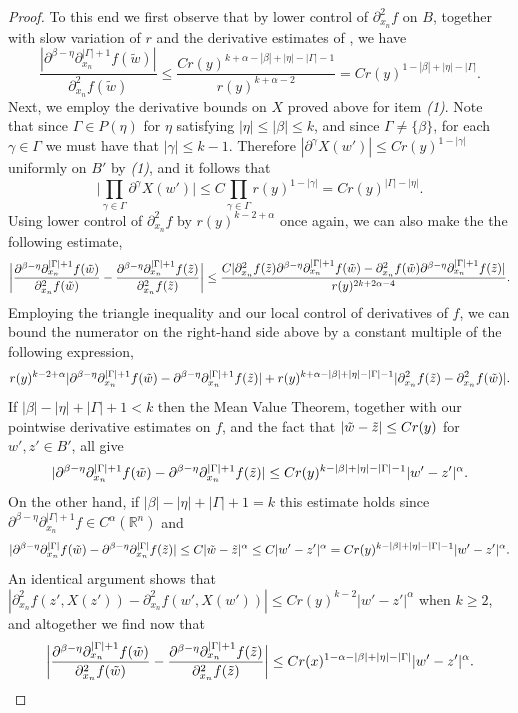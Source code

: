 \documentclass[oneside,hidelinks,indentfirst,10pt]{book}
\begin{document}
\begin{proof}
To this end we first observe that by lower control of \(\partial^2_{x_n}f\) on \(B\), together with slow variation of \(r\) and the derivative estimates of , we have
\[
    \frac{|\partial^{\beta-\eta}\partial^{|\Gamma|+1}_{x_n}f(\tilde{w})|}{\partial^2_{x_n}f(\tilde{w})}\leq \frac{Cr(y)^{k+\alpha-|\beta|+|\eta|-|\Gamma|-1}}{r(y)^{k+\alpha-2}}=Cr(y)^{1-|\beta|+|\eta|-|\Gamma|}.
\]
Next, we employ the derivative bounds on \(X\) proved above for item \textit{(1)}. Note that since \(\Gamma\in P(\eta)\) for \(\eta\) satisfying \(|\eta|\leq |\beta|\leq k\), and since \(\Gamma\neq\{\beta\}\), for each \(\gamma\in \Gamma \) we must have that \(|\gamma|\leq k-1\). Therefore \(|\partial^\gamma X(w')|\leq Cr(y)^{1-|\gamma|}\) uniformly on \(B'\) by \textit{(1)}, and it follows that
\[
    \bigg|\prod_{\gamma\in\Gamma}\partial^\gamma X(w')\bigg|\leq C\prod_{\gamma\in\Gamma}r(y)^{1-|\gamma|}=Cr(y)^{|\Gamma|-|\eta|}.
\]
Using lower control of \(\partial^2_{x_n}f\) by \(r(y)^{k-2+\alpha}\) once again, we can also make the the following estimate,
\[
    \bigg|\frac{\partial^{\beta-\eta}\partial^{|\Gamma|+1}_{x_n}f(\tilde{w})}{\partial^2_{x_n}f(\tilde{w})}-\frac{\partial^{\beta-\eta}\partial^{|\Gamma|+1}_{x_n}f(\Tilde{z})}{\partial^2_{x_n}f(\Tilde{z})}\bigg|\leq \frac{C|\partial^2_{x_n}f(\Tilde{z})\partial^{\beta-\eta}\partial^{|\Gamma|+1}_{x_n}f(\tilde{w})-\partial^2_{x_n}f(\tilde{w})\partial^{\beta-\eta}\partial^{|\Gamma|+1}_{x_n}f(\Tilde{z})|}{r(y)^{2k+2\alpha-4}}.
\]
Employing the triangle inequality and our local control of derivatives of \(f\), we can bound the numerator on the right-hand side above by a constant multiple of the following expression,
\[
    r(y)^{k-2+\alpha}|\partial^{\beta-\eta}\partial^{|\Gamma|+1}_{x_n}f(\tilde{w})-\partial^{\beta-\eta}\partial^{|\Gamma|+1}_{x_n}f(\Tilde{z})|+r(y)^{k+\alpha-|\beta|+|\eta|-|\Gamma|-1}|\partial^2_{x_n}f(\Tilde{z})-\partial^2_{x_n}f(\tilde{w})|.
\]
If \(|\beta|-|\eta|+|\Gamma|+1<k\) then the Mean Value Theorem, together with our pointwise derivative estimates on \(f\), and the fact that \(|\tilde{w}-\Tilde{z}|\leq Cr(y)\) for \(w',z'\in B'\), all give
\[
    |\partial^{\beta-\eta}\partial^{|\Gamma|+1}_{x_n}f(\tilde{w})-\partial^{\beta-\eta}\partial^{|\Gamma|+1}_{x_n}f(\Tilde{z})|\leq Cr(y)^{k-|\beta|+|\eta|-|\Gamma|-1}|w'-z'|^\alpha.
\]
On the other hand, if \(|\beta|-|\eta|+|\Gamma|+1=k\) this estimate holds since \(\partial^{\beta-\eta}\partial^{|\Gamma|+1}_{x_n}f\in C^\alpha(\mathbb{R}^n)\) and 
\[
    |\partial^{\beta-\eta}\partial^{|\Gamma|}_{x_n}f(\tilde{w})-\partial^{\beta-\eta}\partial^{|\Gamma|}_{x_n}f(\Tilde{z})|\leq C|\tilde{w}-\Tilde{z}|^\alpha\leq C|w'-z'|^\alpha=Cr(y)^{k-|\beta|+|\eta|-|\Gamma|-1}|w'-z'|^\alpha.
\]
An identical argument shows that \(|\partial^2_{x_n}f(z',X(z'))-\partial^2_{x_n}f(w',X(w'))|\leq Cr(y)^{k-2}|w'-z'|^\alpha\) when \(k\geq 2\), and altogether we find now that
\[
    \bigg|\frac{\partial^{\beta-\eta}\partial^{|\Gamma|+1}_{x_n}f(\tilde{w})}{\partial^2_{x_n}f(\tilde{w})}-\frac{\partial^{\beta-\eta}\partial^{|\Gamma|+1}_{x_n}f(\Tilde{z})}{\partial^2_{x_n}f(\Tilde{z})}\bigg|\leq Cr(x)^{1-\alpha-|\beta|+|\eta|-|\Gamma|}|w'-z'|^\alpha.
\]



\end{proof}
\end{document}
